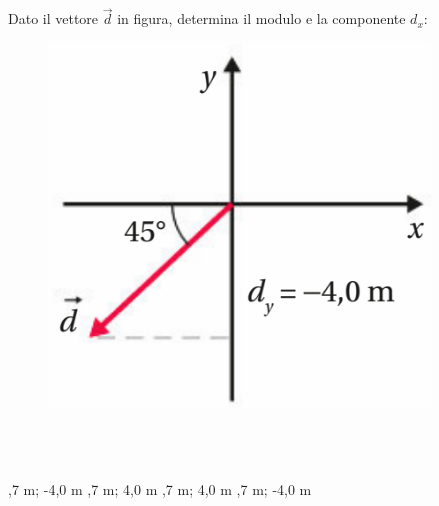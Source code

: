 \documentclass[a4paper,11pt]{exam}
\begin{document}
\begin{questions}
    
\question Dato il vettore $\vec{d}$ in figura, determina il modulo e la componente $d_x$: \begin{figure}[h!]   \begin{center}     \includegraphics[scale=0.35]{vettored.png}   \end{center} \end{figure}\\\
\begin{oneparchoices}
  ,7 m; -4,0 m
  ,7 m; 4,0 m
  \choice 5,7 m; 4,0 m
  ,7 m; -4,0 m
\end{oneparchoices}

    
\end{questions}

    
    \newpage
    
    
\end{document}
